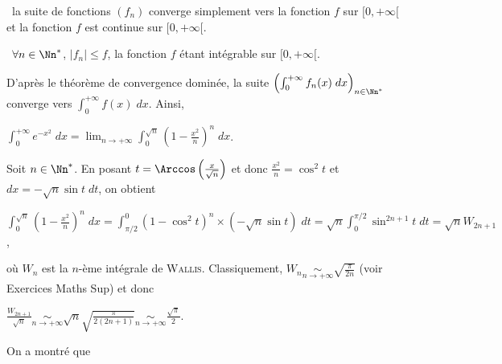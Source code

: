 {\begin{enumerate}
{\textbullet~la suite de fonctions $(f_n)$ converge simplement vers la fonction $f$ sur $[0,+\infty[$ et la fonction $f$ est continue sur $[0,+\infty[$.

\textbullet~$\forall n\in\Nn^*$, $|f_n|\leqslant f$, la fonction $f$ étant intégrable sur $[0,+\infty[$.

D'après le théorème de convergence dominée, la suite $\left(\int_{0}^{+\infty}f_n(x)\;dx\right)_{n\in\Nn^*}$ converge vers $\int_{0}^{+\infty}f(x)\;dx$. Ainsi,

\begin{center}
$\int_{0}^{+\infty}e^{-x^2}\;dx=\lim_{n \rightarrow +\infty}\int_{0}^{\sqrt{n}}\left(1-\frac{x^2}{n}\right)^n\;dx$.
\end{center}

Soit $n\in\Nn^*$. En posant $t=\Arccos\left(\frac{x}{\sqrt{n}}\right)$ et donc $\frac{x^2}{n}=\cos^2t$ et $dx=-\sqrt{n}\sin t\;dt$, on obtient

\begin{center}
$\int_{0}^{\sqrt{n}}\left(1-\frac{x^2}{n}\right)^n\;dx=\int_{\pi/2}^{0}(1-\cos^2t)^n\times(-\sqrt{n}\sin t)\;dt=\sqrt{n}\int_{0}^{\pi/2}\sin^{2n+1}t\;dt=\sqrt{n}W_{2n+1}$,
\end{center}

où $W_n$ est la $n$-ème intégrale de \textsc{Wallis}. Classiquement, $W_n\underset{n\rightarrow+\infty}{\sim}\sqrt{\frac{\pi}{2n}}$ (voir Exercices Maths Sup) et donc

\begin{center}
$\frac{W_{2n+1}}{\sqrt{n}}\underset{n\rightarrow+\infty}{\sim}\sqrt{n}\sqrt{\frac{\pi}{2(2n+1)}}\underset{n\rightarrow+\infty}{\sim}\frac{\sqrt{\pi}}{2}$.
\end{center}

On a montré que

\begin{center}
\end{center}}
\end{enumerate}
}
